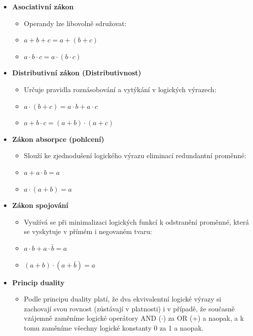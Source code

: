 \begin{itemize}
            \item \textbf{Asociativní zákon}
            \begin{itemize}
                \item Operandy lze libovolně sdružovat:
                \item $a + b + c = a + (b + c)$
                \item $a \cdot b \cdot c = a \cdot (b \cdot c)$
            \end{itemize}
        
            \item \textbf{Distributivní zákon (Distributivnost)}
            \begin{itemize}
                \item Určuje pravidla roznásobování a vytýkání v logických výrazech:
                \item $a \cdot (b + c) = a \cdot b + a \cdot c$
                \item $a + b \cdot c = (a + b) \cdot (a + c)$
            \end{itemize}
        
            \item \textbf{Zákon absorpce (pohlcení)}
            \begin{itemize}
                \item Slouží ke zjednodušení logického výrazu eliminací redundantní proměnné:
                \item $a + a \cdot b = a$
                \item $a \cdot (a + b) = a$
            \end{itemize}
        
            \item \textbf{Zákon spojování}
            \begin{itemize}
                \item Využívá se při minimalizaci logických funkcí k odstranění proměnné, která se vyskytuje v přímém i negovaném tvaru:
                \item $a \cdot b + a \cdot \bar{b} = a$
                \item $(a + b) \cdot (a + \bar{b}) = a$
            \end{itemize}

            \item \textbf{Princip duality}
            \begin{itemize}
                \item Podle principu duality platí, že dva ekvivalentní logické výrazy si zachovají svou rovnost (zůstávají v platnosti) i v případě, že současně vzájemně zaměníme logické operátory AND ($\cdot$) za OR (+) a naopak, a k tomu zaměníme všechny logické konstanty 0 za 1 a naopak.
            \end{itemize}
        

\end{itemize}
